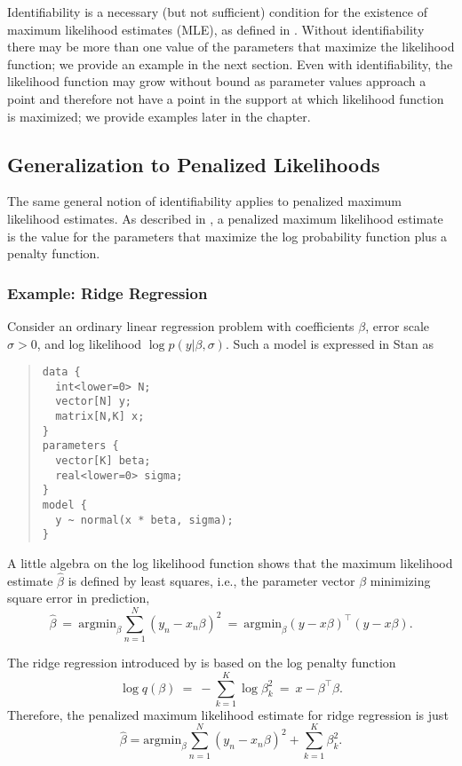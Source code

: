Identifiability is a necessary (but not sufficient) condition for the
existence of maximum likelihood estimates (MLE), as defined
in .  Without identifiability there may be more than one value of the
parameters that maximize the likelihood function; we provide an
example in the next section. Even with identifiability, the likelihood
function may grow without bound as parameter values approach a point
and therefore not have a point in the support at which likelihood
function is maximized; we provide examples later in the chapter.

\subsection{Generalization to Penalized Likelihoods}

The same general notion of identifiability applies to penalized
maximum likelihood estimates.  As described in , a
penalized maximum likelihood estimate is the value for the parameters
that maximize the log probability function plus a penalty function.

\subsubsection{Example: Ridge Regression}

Consider an ordinary linear regression problem with coefficients
$\beta$, error scale $\sigma > 0$, and log likelihood $\log
p(y|\beta,\sigma)$.   Such a model is expressed in Stan as
%
\begin{quote}
\begin{Verbatim}
data {
  int<lower=0> N;
  vector[N] y;
  matrix[N,K] x;
}
parameters {
  vector[K] beta;
  real<lower=0> sigma;
}
model {
  y ~ normal(x * beta, sigma);
}
\end{Verbatim}
\end{quote}
%
A little algebra on the log likelihood function shows that the maximum
likelihood estimate $\hat{\beta}$ is defined by least squares, i.e., 
the parameter vector $\beta$ minimizing square error in prediction,
%
\[
\hat{\beta} 
\ = \
\mbox{argmin}_{\beta} \sum_{n=1}^N (y_n - x_n \beta)^2
\ = \ 
\mbox{argmin}_{\beta} (y - x \beta)^{\top} (y - x\beta).
\]
%

The ridge regression introduced by \citep{HoerlKennard:1970} is based
on the log penalty function
\[
\log q(\beta) 
\ = \
- \sum_{k=1}^K \log \beta_k^2
\ = \ 
x- \beta^{\top} \beta.
\]
Therefore, the penalized maximum likelihood estimate for ridge
regression is just
\[
\hat{\beta} = \mbox{argmin}_{\beta} \sum_{n=1}^N (y_n - x_n \beta)^2 +
\sum_{k=1}^K \beta_k^2.
\]


